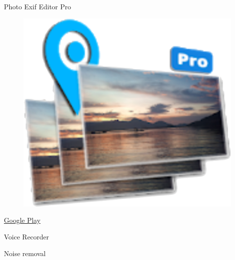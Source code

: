 \documentclass[serif,14pt,color=usenames,dvipsnames]{beamer}
\begin{document}
\begin{frame}{Photo Exif Editor Pro}
  \centering

  \begin{figure}
  \includegraphics[width=0.3\linewidth]{imgs/exif}
  \end{figure}

  \href{https://play.google.com/store/apps/details?id=net.xnano.android.photoexifeditor}{Google
  Play }
\end{frame}

\begin{frame}{Voice Recorder}

\end{frame}

\begin{frame}{Noise removal}
\end{frame}
\end{document}
